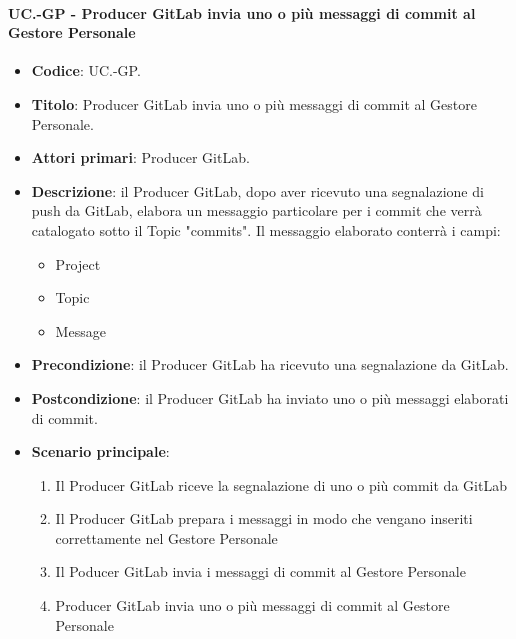 	\paragraph{UC\theuccount.\thesubuccount-GP - Producer GitLab invia uno o più messaggi di commit al Gestore Personale}
		
		\begin{itemize}
			\item \textbf{Codice}: UC\theuccount.\thesubuccount-GP.
			\item \textbf{Titolo}: Producer GitLab invia uno o più messaggi di commit al Gestore Personale.
			\item \textbf{Attori primari}: Producer GitLab.
			\item \textbf{Descrizione}: il Producer GitLab, dopo aver ricevuto una segnalazione di push da GitLab,	elabora un messaggio particolare per i commit che verrà catalogato sotto il Topic "commits".
			Il messaggio elaborato conterrà i campi:
			\begin{itemize}
				\item Project
				\item Topic
				\item Message
			\end{itemize}
			\item \textbf{Precondizione}: il Producer GitLab ha ricevuto una segnalazione da GitLab.
			\item \textbf{Postcondizione}: il Producer GitLab ha inviato uno o più messaggi elaborati di commit.
			\item \textbf{Scenario principale}: 
			\begin{enumerate}
				\item Il Producer GitLab riceve la segnalazione di uno o più commit da GitLab
				\item Il Producer GitLab prepara i messaggi in modo che vengano inseriti correttamente nel Gestore Personale
				\item Il Poducer GitLab invia i messaggi di
				commit al Gestore Personale
				\item Producer GitLab invia uno o più messaggi
			 	di commit al Gestore Personale
			\end{enumerate}
			
		\end{itemize}
		
